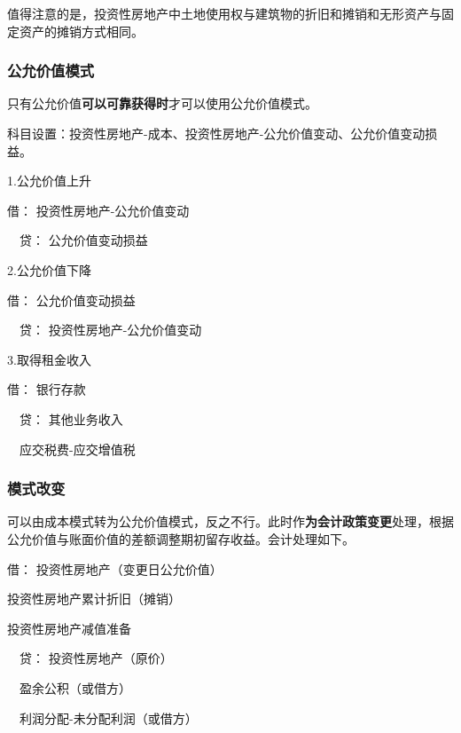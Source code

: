 \documentclass[UTF8,12pt]{ctexart}
\newenvironment{Dr}{\noindent 借：}{\par}
\newenvironment{Cr}{\noindent \ \ 贷：}{\par}
\numberwithin{equation}{section} %
\numberwithin{figure}{section}
\numberwithin{table}{section}
\begin{document}
	值得注意的是，投资性房地产中土地使用权与建筑物的折旧和摊销和无形资产与固定资产的摊销方式相同。
	
	\subsubsection{公允价值模式}
	只有公允价值\textbf{可以可靠获得时}才可以使用公允价值模式。
	
	科目设置：投资性房地产-成本、投资性房地产-公允价值变动、公允价值变动损益。
	
	1.公允价值上升
	
	\begin{Dr}
		投资性房地产-公允价值变动
	\end{Dr}
	\begin{Cr}
		公允价值变动损益
	\end{Cr}

	
	2.公允价值下降
	
	\begin{Dr}
		公允价值变动损益
	\end{Dr}
	\begin{Cr}
		投资性房地产-公允价值变动
	\end{Cr}

	
	3.取得租金收入
	
	\begin{Dr}
		银行存款
	\end{Dr}
	\begin{Cr}
		其他业务收入
		
		\ \ 应交税费-应交增值税
	\end{Cr}
	
	\subsubsection{模式改变}
	可以由成本模式转为公允价值模式，反之不行。此时作\textbf{为会计政策变更}处理，根据公允价值与账面价值的差额调整期初留存收益。会计处理如下。
	
	\begin{Dr}
		投资性房地产（变更日公允价值）
		
		投资性房地产累计折旧（摊销）
		
		投资性房地产减值准备
	\end{Dr}
	\begin{Cr}
		投资性房地产（原价）
		
		\ \ 盈余公积（或借方）
		
		\ \ 利润分配-未分配利润（或借方）
	\end{Cr}
\end{document}
